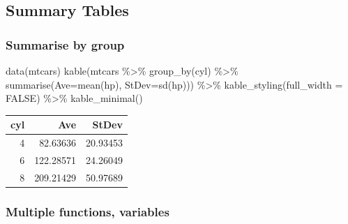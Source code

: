\documentclass[
]{article}
\newenvironment{Shaded}{\begin{snugshade}}{\end{snugshade}}
\newcommand{\AttributeTok}[1]{\textcolor[rgb]{0.77,0.63,0.00}{#1}}
\newcommand{\ConstantTok}[1]{\textcolor[rgb]{0.00,0.00,0.00}{#1}}
\newcommand{\FunctionTok}[1]{\textcolor[rgb]{0.00,0.00,0.00}{#1}}
\newcommand{\NormalTok}[1]{#1}
\newcommand{\SpecialCharTok}[1]{\textcolor[rgb]{0.00,0.00,0.00}{#1}}
\begin{document}
\hypertarget{summary-tables}{%
\subsection{Summary Tables}\label{summary-tables}}

\hypertarget{summarise-by-group}{%
\subsubsection{Summarise by group}\label{summarise-by-group}}

\begin{Shaded}
\begin{Highlighting}[]
\FunctionTok{data}\NormalTok{(mtcars)}
\FunctionTok{kable}\NormalTok{(mtcars }\SpecialCharTok{\%\textgreater{}\%} \FunctionTok{group\_by}\NormalTok{(cyl) }\SpecialCharTok{\%\textgreater{}\%} \FunctionTok{summarise}\NormalTok{(}\AttributeTok{Ave=}\FunctionTok{mean}\NormalTok{(hp), }\AttributeTok{StDev=}\FunctionTok{sd}\NormalTok{(hp))) }\SpecialCharTok{\%\textgreater{}\%} 
  \FunctionTok{kable\_styling}\NormalTok{(}\AttributeTok{full\_width =} \ConstantTok{FALSE}\NormalTok{) }\SpecialCharTok{\%\textgreater{}\%} \FunctionTok{kable\_minimal}\NormalTok{()}
\end{Highlighting}
\end{Shaded}

\begin{table}
\centering
\begin{tabular}{r|r|r}
\hline
cyl & Ave & StDev\\
\hline
4 & 82.63636 & 20.93453\\
\hline
6 & 122.28571 & 24.26049\\
\hline
8 & 209.21429 & 50.97689\\
\hline
\end{tabular}
\end{table}

\hypertarget{multiple-functions-variables}{%
\subsubsection{Multiple functions, variables}\label{multiple-functions-variables}}
\end{document}
